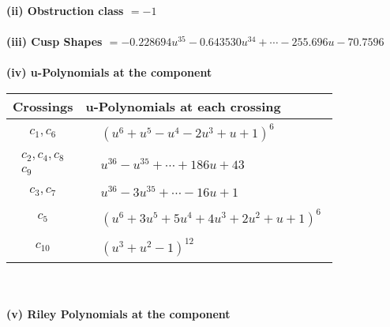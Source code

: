 \documentclass[1p]{elsarticle_modified}
\theoremstyle{definition}
\begin{document}
\flushleft \textbf{(ii) Obstruction class $= -1$}\\~\\
\flushleft \textbf{(iii) Cusp Shapes $= -0.228694 u^{35}-0.643530 u^{34}+\cdots-255.696 u-70.7596$}\\~\\
\newpage\renewcommand{\arraystretch}{1}
\flushleft \textbf{(iv) u-Polynomials at the component}\newline \\
\begin{tabular}{m{50pt}|m{274pt}}
Crossings & \hspace{64pt}u-Polynomials at each crossing \\
\hline $$\begin{aligned}c_{1},c_{6}\end{aligned}$$&$\begin{aligned}
&(u^6+u^5- u^4-2 u^3+u+1)^6
\end{aligned}$\\
\hline $$\begin{aligned}c_{2},c_{4},c_{8}\\c_{9}\end{aligned}$$&$\begin{aligned}
&u^{36}- u^{35}+\cdots+186 u+43
\end{aligned}$\\
\hline $$\begin{aligned}c_{3},c_{7}\end{aligned}$$&$\begin{aligned}
&u^{36}-3 u^{35}+\cdots-16 u+1
\end{aligned}$\\
\hline $$\begin{aligned}c_{5}\end{aligned}$$&$\begin{aligned}
&(u^6+3 u^5+5 u^4+4 u^3+2 u^2+u+1)^6
\end{aligned}$\\
\hline $$\begin{aligned}c_{10}\end{aligned}$$&$\begin{aligned}
&(u^3+u^2-1)^{12}
\end{aligned}$\\
\hline
\end{tabular}\\~\\
\newpage\renewcommand{\arraystretch}{1}
\flushleft \textbf{(v) Riley Polynomials at the component}\newline \\
\end{document}
